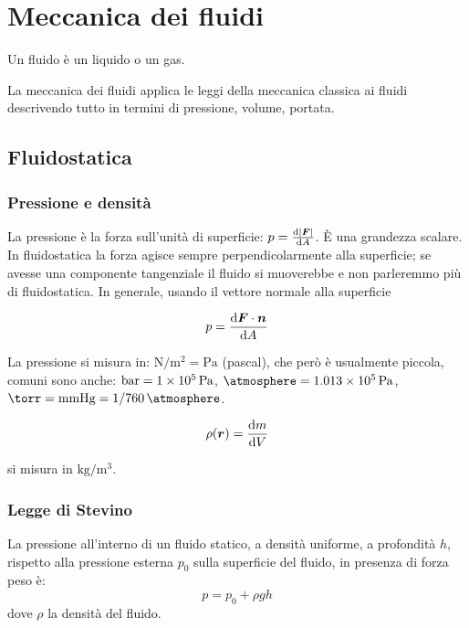 \chapter{Meccanica dei fluidi}
\minitoc

\begin{Def}[Fluido]
   Un fluido è un liquido o un gas.
\end{Def}

La meccanica dei fluidi applica le leggi della meccanica classica ai fluidi descrivendo tutto in termini di pressione, volume, portata.
\section{Fluidostatica}
\subsection{Pressione e densità}
La pressione è la forza sull'unità di superficie: $p=\frac{\mathrm{d} |\boldsymbol{F}|}{\mathrm{d} A}$. \`E una grandezza scalare. In fluidostatica la forza agisce sempre perpendicolarmente alla superficie; se avesse una componente tangenziale il fluido si muoverebbe e non parleremmo più di fluidostatica. In generale, usando il vettore normale alla superficie
\begin{Def}[pressione]
   \begin{equation}
      p=\frac{\mathrm{d}\boldsymbol{F}\cdot \boldsymbol{n}}{\mathrm{d} A}
   \end{equation}
\end{Def}
La pressione si misura in: $\si{\newton\per\meter\squared}=\si{\pascal}$ (pascal), che però è usualmente piccola,
comuni sono anche: $\si{\bar}=\SI{1E5}{\pascal}$,
$\si{\atmosphere}=\SI{1.013E5}{\pascal}$,
$\si{\torr}=\text{mmHg}=\SI[parse-numbers = false]{1/760}{\atmosphere}$. %
\begin{Def}
   \begin{equation}
      \rho(\boldsymbol{r})=\frac{\mathrm{d} m}{\mathrm{d} V}
   \end{equation}
\end{Def}
si misura in $\si{\kilogram/\metre^3}$.

\subsection{Legge di Stevino}
\begin{legge}[Stevino]
   La pressione all'interno di un fluido statico, a densità uniforme, a profondità $h$, rispetto alla pressione esterna $p_0$ sulla superficie del fluido, in presenza di forza peso è:
   \begin{equation}
      p = p_0 + \rho g h
   \end{equation}
   dove $\rho$ la densità del fluido.
\end{legge}

